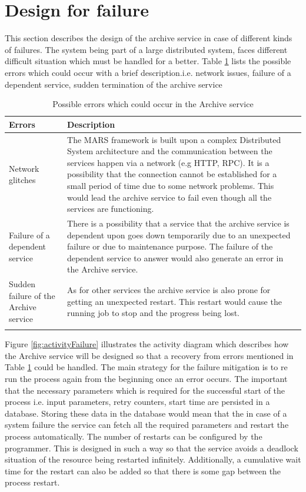 \section{Design for failure}
This section describes the design of the archive service in case of different kinds of failures. The system being part of a large distributed system,
faces different difficult situation which must be handled for a better. Table \ref{table:probServices} lists the possible errors which 
could occur with a brief description.i.e. network issues, failure of a 
dependent service, sudden termination of the archive service 
\begin{longtable}{|p{4cm}|p{10cm}|}
    \hline
        \textbf{Errors}  & \textbf{Description}\\
    \hline
        Network glitches & The MARS framework is built upon a complex Distributed System architecture and the communication between the services
        happen via a network (e.g HTTP, RPC). It is a possibility that the connection cannot be established for a small period of time due to some network problems.
        This would lead the archive service to fail even though all the services are functioning.\\
    \hline
        Failure of a dependent service & There is a possibility that a service that the archive service is dependent upon goes down temporarily due to an unexpected
        failure or due to maintenance purpose. The failure of the dependent service to answer would also generate an error in the Archive service.\\
    \hline
        Sudden failure of the Archive service & As for other services the archive service is also prone for getting an unexpected restart. This restart would cause
        the running job to stop and the progress being lost.\\    
    \hline
    \caption{Possible errors which could occur in the Archive service}
    \label{table:probServices} 
\end{longtable}

Figure \ref{fig:activityFailure} illustrates the activity diagram which describes how the Archive service will be designed so that a recovery from errors mentioned in
Table \ref{table:probServices} could be handled. The main strategy for the failure mitigation is to re run the process again from the beginning once an error occurs. 
The important that the necessary parameters which is required for the successful start of the process i.e. input parameters, retry counters, start time are persisted
in a database. Storing these data in the database would mean that the in case of a system failure the service can fetch all the required parameters and restart the 
process automatically. The number of restarts can be configured by the programmer. This is designed in such a way so that the service avoids a deadlock situation of the
resource being restarted infinitely. Additionally, a cumulative wait time for the restart can also be added so that there is some gap between the process restart.

